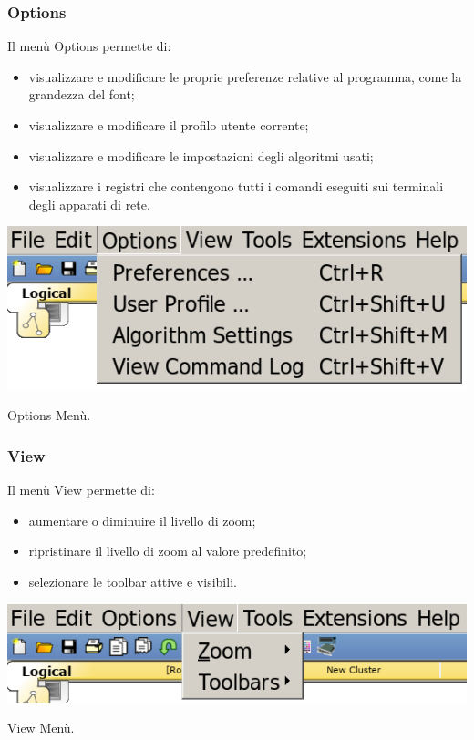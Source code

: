 \subsubsection{Options}
Il menù Options permette di: 

\begin{itemize}
    \item visualizzare e modificare le proprie preferenze relative al programma, come la grandezza del font;
    \item visualizzare e modificare il profilo utente corrente;
    \item visualizzare e modificare le impostazioni degli algoritmi usati;
    \item visualizzare i registri che contengono tutti i comandi eseguiti sui terminali degli apparati di rete.
\end{itemize}

\begin{sfigure}
    \centering
    \captionsetup{type=figure}
    \includegraphics[scale=.35]{images/02.packet-tracer/options.png}
    \caption{Options Menù.}
\end{sfigure}

\subsubsection{View}
Il menù View permette di: 

\begin{itemize}
    \item aumentare o diminuire il livello di zoom;
    \item ripristinare il livello di zoom al valore predefinito;
    \item selezionare le toolbar attive e visibili.
\end{itemize}

\begin{sfigure}
    \centering
    \captionsetup{type=figure}
    \includegraphics[scale=.35]{images/02.packet-tracer/view.png}
    \caption{View Menù.}
\end{sfigure}

